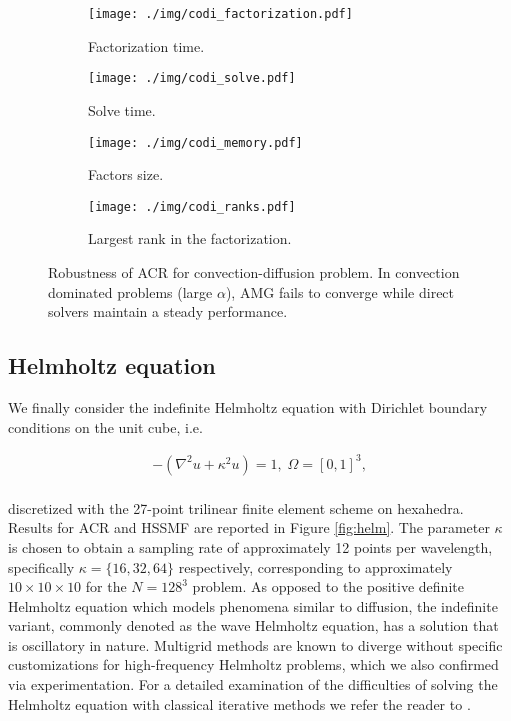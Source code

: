 \documentclass[]{elsarticle}
\begin{document}
\begin{figure}[]
	\centering
	\begin{subfigure}{0.4\textwidth}
		\centering
		\texttt{[image: ./img/codi\_factorization.pdf]}
		\caption{Factorization time.}
		\label{fig:codi1}
	\end{subfigure}
	\begin{subfigure}{0.4\textwidth}
		\centering
		\texttt{[image: ./img/codi\_solve.pdf]}
		\caption{Solve time.}
		\label{fig:codi2}
	\end{subfigure}
	\begin{subfigure}{0.4\textwidth}
		\centering
		\texttt{[image: ./img/codi\_memory.pdf]}
		\caption{Factors size.}
		\label{fig:codi3}
	\end{subfigure}
	\begin{subfigure}{0.4\textwidth}
		\centering
		\texttt{[image: ./img/codi\_ranks.pdf]}
		\caption{Largest rank in the factorization.}
		\label{fig:codi4}
	\end{subfigure}
\caption{Robustness of ACR for convection-diffusion problem. In convection dominated problems (large $\alpha$), AMG fails to converge while direct solvers maintain a steady performance.}
\label{fig_codi}
\end{figure}

\subsection{Helmholtz equation}

We finally consider the indefinite Helmholtz equation with Dirichlet boundary conditions on the unit cube, i.e.

\begin{equation}
\begin{aligned}
- (\nabla^2u + \kappa^2u) = 1, \; \Omega = [0,1]^3,  \\
\end{aligned}
\label{helmholtzEquation}
\end{equation}

\noindent discretized with the 27-point trilinear finite element scheme on hexahedra. Results for ACR and HSSMF are reported in Figure \ref{fig:helm}. The parameter $\kappa$ is chosen to obtain a sampling rate of approximately 12 points per wavelength, specifically $\kappa=\{16,32,64\}$ respectively, corresponding to approximately $10 \times 10 \times 10$ for the $N=128^3$ problem. As opposed to the positive definite Helmholtz equation which models phenomena similar to diffusion, the indefinite variant, commonly denoted as the wave Helmholtz equation, has a solution that is oscillatory in nature. Multigrid methods are known to diverge without specific customizations for high-frequency Helmholtz problems, which we also confirmed via experimentation. For a detailed examination of the difficulties of solving the Helmholtz equation with classical iterative methods we refer the reader to \cite{ernst2012difficult}.
\end{document}
